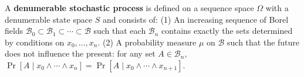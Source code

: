 A \textbf{denumerable stochastic process} is defined on a sequence space $\Omega$ with a denumerable state space $S$ and consists of:
(1) An increasing sequence of Borel fields $\mathcal{B}_0 \subset \mathcal{B}_1 \subset \cdots \subset \mathcal{B}$ such that each $\mathcal{B}_n$ contains exactly the sets determined by conditions on $x_0, \ldots, x_n$.
(2) A probability measure $\mu$ on $\mathcal{B}$ such that the future does not influence the present: for any set $A \in \mathcal{B}_n$, $\Pr[A \mid x_0 \wedge \cdots \wedge x_n] = \Pr[A \mid x_0 \wedge \cdots \wedge x_{n+1}]$.